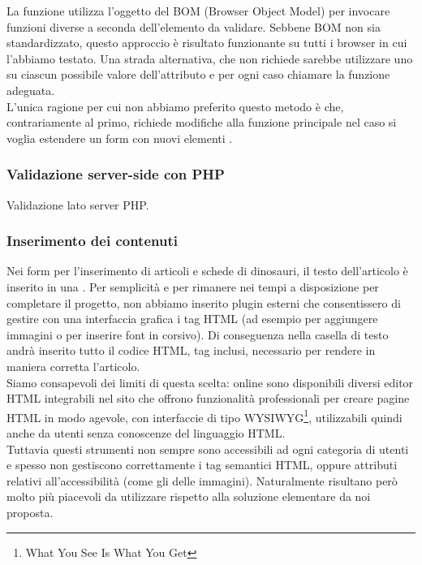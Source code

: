 \documentclass[12pt]{article}
\begin{document}
	La funzione  utilizza l'oggetto  del BOM (Browser Object Model) per invocare funzioni diverse a seconda dell'elemento da validare. Sebbene BOM non sia standardizzato, questo approccio è risultato funzionante su tutti i browser in cui l'abbiamo testato. Una strada alternativa, che non richiede  sarebbe utilizzare uno  su ciascun possibile valore dell'attributo  e per ogni caso chiamare la funzione adeguata.\\ L'unica ragione per cui non abbiamo preferito questo metodo è che, contrariamente al primo, richiede modifiche alla funzione principale  nel caso si voglia estendere un form con nuovi elementi . 
	
	\subsubsection*{Validazione server-side con PHP}
	Validazione lato server PHP. 
	
	\subsubsection{Inserimento dei contenuti} \label{sssec:inserimentocontenuti}
	Nei form per l'inserimento di articoli e schede di dinosauri, il testo dell'articolo è inserito in una . Per semplicità e per rimanere nei tempi a disposizione per completare il progetto, non abbiamo inserito plugin esterni che consentissero di gestire con una interfaccia grafica i tag HTML (ad esempio per aggiungere immagini o per inserire font in corsivo). Di conseguenza nella casella di testo andrà inserito tutto il codice HTML, tag inclusi, necessario per rendere in maniera corretta l'articolo. \\
	Siamo consapevoli dei limiti di questa scelta: online sono disponibili diversi editor HTML integrabili nel sito che offrono funzionalità professionali per creare pagine HTML in modo agevole, con interfaccie di tipo WYSIWYG\footnote{What You See Is What You Get}, utilizzabili quindi anche da utenti senza conoscenze del linguaggio HTML.\\
	Tuttavia questi strumenti non sempre sono accessibili ad ogni categoria di utenti e spesso non gestiscono correttamente i tag semantici HTML, oppure attributi relativi all'accessibilità (come gli  delle immagini). Naturalmente risultano però molto più piacevoli da utilizzare rispetto alla soluzione elementare da noi proposta.
	
\end{document}
